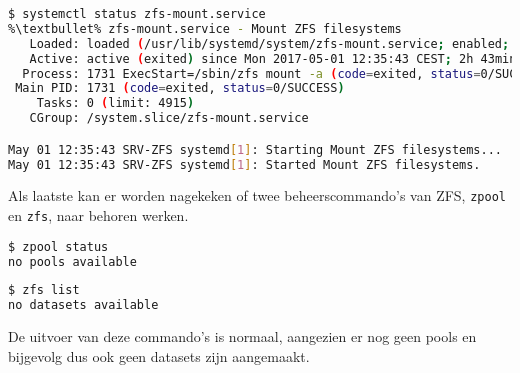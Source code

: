 \begin{lstlisting}[language=bash,style=command_style,escapechar=\%]
$ systemctl status zfs-mount.service
%\textbullet% zfs-mount.service - Mount ZFS filesystems
   Loaded: loaded (/usr/lib/systemd/system/zfs-mount.service; enabled; vendor 
   Active: active (exited) since Mon 2017-05-01 12:35:43 CEST; 2h 43min ago
  Process: 1731 ExecStart=/sbin/zfs mount -a (code=exited, status=0/SUCCESS)
 Main PID: 1731 (code=exited, status=0/SUCCESS)
    Tasks: 0 (limit: 4915)
   CGroup: /system.slice/zfs-mount.service

May 01 12:35:43 SRV-ZFS systemd[1]: Starting Mount ZFS filesystems...
May 01 12:35:43 SRV-ZFS systemd[1]: Started Mount ZFS filesystems.
\end{lstlisting}

Als laatste kan er worden nagekeken of twee beheerscommando's van ZFS, \texttt{zpool} en \texttt{zfs}, naar behoren werken.

\begin{lstlisting}[language=bash,style=command_style]
$ zpool status
no pools available
\end{lstlisting}

\begin{lstlisting}[language=bash,style=command_style]
$ zfs list
no datasets available
\end{lstlisting}

De uitvoer van deze commando's is normaal, aangezien er nog geen pools en bijgevolg dus ook geen datasets zijn aangemaakt.
